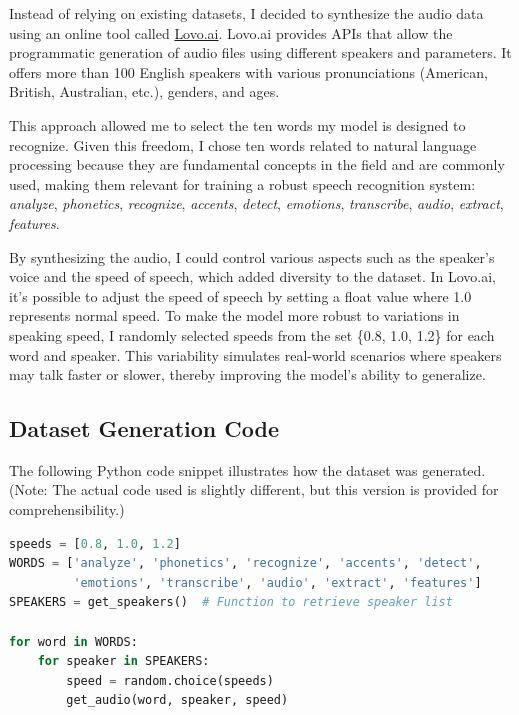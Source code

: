 \documentclass[12pt]{article}
\begin{document}
Instead of relying on existing datasets, I decided to synthesize the audio data using an online tool called \href{https://lovo.ai}{Lovo.ai}. Lovo.ai provides APIs that allow the programmatic generation of audio files using different speakers and parameters. It offers more than 100 English speakers with various pronunciations (American, British, Australian, etc.), genders, and ages.

This approach allowed me to select the ten words my model is designed to recognize. Given this freedom, I chose ten words related to natural language processing because they are fundamental concepts in the field and are commonly used, making them relevant for training a robust speech recognition system: \textit{analyze}, \textit{phonetics}, \textit{recognize}, \textit{accents}, \textit{detect}, \textit{emotions}, \textit{transcribe}, \textit{audio}, \textit{extract}, \textit{features}.

By synthesizing the audio, I could control various aspects such as the speaker's voice and the speed of speech, which added diversity to the dataset. In Lovo.ai, it's possible to adjust the speed of speech by setting a float value where 1.0 represents normal speed. To make the model more robust to variations in speaking speed, I randomly selected speeds from the set \{0.8, 1.0, 1.2\} for each word and speaker. This variability simulates real-world scenarios where speakers may talk faster or slower, thereby improving the model's ability to generalize.

\subsection{Dataset Generation Code}

The following Python code snippet illustrates how the dataset was generated. (Note: The actual code used is slightly different, but this version is provided for comprehensibility.)

\begin{lstlisting}[language=Python, caption=Dataset Generation Script]
speeds = [0.8, 1.0, 1.2]
WORDS = ['analyze', 'phonetics', 'recognize', 'accents', 'detect',
         'emotions', 'transcribe', 'audio', 'extract', 'features']
SPEAKERS = get_speakers()  # Function to retrieve speaker list

for word in WORDS:
    for speaker in SPEAKERS:
        speed = random.choice(speeds)
        get_audio(word, speaker, speed)
\end{lstlisting}
\end{document}
